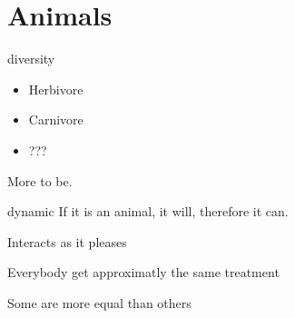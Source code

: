\section{Animals}


\begin{frame}{diversity}
	\begin{itemize}[<+->]
		\item Herbivore
		\item Carnivore 
		\item ??? 
	\end{itemize}
	\pause More to be.
\end{frame}

\begin{frame}{dynamic}
	If it is an animal, it will, therefore it can.
	
	\pause Interacts as it pleases

	\pause Everybody get approximatly the same treatment

	\pause Some are more equal than others
\end{frame}